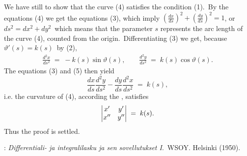\documentclass[12pt]{article}
\theoremstyle{definition}
\begin{document}
We have still to show that the curve (4) satisfies the condition (1).\, By  the equations (4) we get the equations (3), which imply\; $(\frac{dx}{ds})^2+(\frac{dy}{ds})^2 = 1$,\; or\, $ds^2 = dx^2+dy^2$\, which means that the parameter $s$ represents the arc length of the curve (4), counted from the origin.\, Differentiating (3) we get, because\, $\vartheta'(s) = k(s)$\, by (2),
\begin{align}
\frac{d^2x}{ds^2} \;=\; -k(s)\sin{\vartheta(s)}, \qquad 
\frac{d^2y}{ds^2} \;=\; k(s)\cos{\vartheta(s)}.    
\end{align}
The equations (3) and (5) then yield
$$\frac{dx}{ds}\frac{d^2y}{ds^2}-\frac{dy}{ds}\frac{d^2x}{ds^2} \;=\; k(s),$$
i.e. the curvature of (4), according the , satisfies
$$ \left| \begin{matrix} x' & y' \cr x'' & y'' \end{matrix} \right| \;=\; k(s).$$
Thus the proof is settled.

\begin{thebibliography}{8}
: {\it Differentiali- ja integralilasku
ja sen sovellutukset I}.\, WSOY. Helsinki (1950).
\end{thebibliography}


\end{document}

